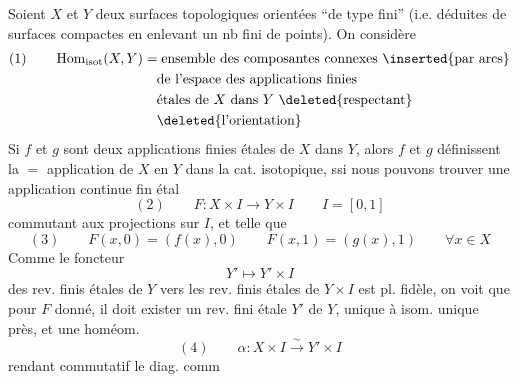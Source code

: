 Soient $X$ et $Y$ deux surfaces topologiques  orientées ``de type fini'' (i.e. déduites de surfaces compactes en enlevant un nb fini de points). On considère
\[
\begin{aligned}
(1)\qquad \operatorname{Hom}_{\mathrm{isot}}(X,Y)
&=\text{ensemble des composantes connexes \inserted{par arcs}}\\
&\quad\text{de l'espace des applications finies}\\
&\quad\text{étales de $X$ dans $Y$ \deleted{respectant}}\\
&\quad\deleted{\text{l'orientation}}
\end{aligned}
\]
Si $f$ et $g$ sont deux applications finies étales de $X$ dans $Y$, alors $f$ et $g$  définissent la $=$  application de $X$ en $Y$ dans la cat. isotopique, ssi nous pouvons trouver une application continue fin étal
\[
(2)\qquad F:X\times I\longrightarrow Y\times I\qquad I=[0,1]
\]
commutant aux projections sur $I$, et telle que
\[
(3)\qquad F(x,0)=(f(x),0)\qquad F(x,1)=(g(x),1)\qquad\forall x\in X
\]
Comme le foncteur
\[
Y'\longmapsto Y'\times I
\]
des rev. finis étales de $Y$ vers les rev. finis étales de $Y\times I$ est pl. fidèle, on voit que  pour $F$ donné, il doit exister un rev. fini étale $Y'$ de $Y$, unique à isom. unique près, et une homéom.
\[
(4)\qquad \alpha:X\times I\xrightarrow{\sim}Y'\times I
\]
rendant commutatif le diag. comm
